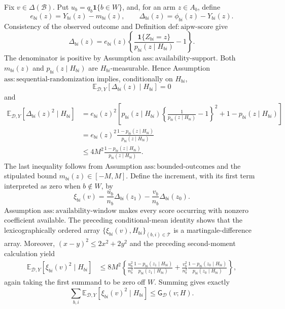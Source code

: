Fix \(v\in\Delta(\mathcal B)\).  Put \(u_b=q_b\mathbf 1\{b\in W\}\), and, for an arm \(z\in A_b\), define
\[
e_{bi}(z)=Y_{bi}(z)-m_{bi}(z),
\qquad
\Delta_{bi}(z)=\phi_{bi}(z)-Y_{bi}(z).
\]
Consistency of the observed outcome and Definition \(\mathrm{def:aipw\text{-}score}\) give
\[
\Delta_{bi}(z)
=e_{bi}(z)\left\{\frac{\mathbf 1\{Z_{bi}=z\}}
 {p_{bi}(z\mid H_{bi})}-1\right\}.
\]
The denominator is positive by Assumption \(\mathrm{ass:availability\text{-}support}\).  Both \(m_{bi}(z)\) and \(p_{bi}(z\mid H_{bi})\) are \(H_{bi}\)-measurable.  Hence Assumption \(\mathrm{ass:sequential\text{-}randomization}\) implies, conditionally on \(H_{bi}\),
\[
\mathbb E_{\mathcal D,Y}[\Delta_{bi}(z)\mid H_{bi}]=0
\]
and
\[
\begin{aligned}
\mathbb E_{\mathcal D,Y}[\Delta_{bi}(z)^2\mid H_{bi}]
&=e_{bi}(z)^2\left[
p_{bi}(z\mid H_{bi})
 \left\{\frac1{p_{bi}(z\mid H_{bi})}-1\right\}^{2}
+1-p_{bi}(z\mid H_{bi})\right]\\
&=e_{bi}(z)^2
 \frac{1-p_{bi}(z\mid H_{bi})}{p_{bi}(z\mid H_{bi})}\\
&\le 4M^2
 \frac{1-p_{bi}(z\mid H_{bi})}{p_{bi}(z\mid H_{bi})}.
\end{aligned}
\]
The last inequality follows from Assumption \(\mathrm{ass:bounded\text{-}outcomes}\) and the stipulated bound \(m_{bi}(z)\in[-M,M]\).  Define the increment, with its first term interpreted as zero when \(b\notin W\), by
\[
\xi_{bi}(v)
=\frac{u_b}{n_b}\Delta_{bi}(z_1)
-\frac{v_b}{n_b}\Delta_{bi}(z_0).
\]
Assumption \(\mathrm{ass:availability\text{-}window}\) makes every score occurring with nonzero coefficient available.  The preceding conditional-mean identity shows that the lexicographically ordered array 
\(\{\xi_{bi}(v),H_{bi}\}_{(b,i)\in\mathcal T}\) is a martingale-difference array.  Moreover, \((x-y)^2\le 2x^2+2y^2\) and the preceding second-moment calculation yield
\[
\begin{aligned}
\mathbb E_{\mathcal D,Y}[\xi_{bi}(v)^2\mid H_{bi}]
&\le 8M^2\left\{
\frac{u_b^2}{n_b^2}
\frac{1-p_{bi}(z_1\mid H_{bi})}{p_{bi}(z_1\mid H_{bi})}
+\frac{v_b^2}{n_b^2}
\frac{1-p_{bi}(z_0\mid H_{bi})}{p_{bi}(z_0\mid H_{bi})}
\right\},
\end{aligned}
\]
again taking the first summand to be zero off \(W\).  Summing gives exactly
\[
\sum_{b,i}\mathbb E_{\mathcal D,Y}[\xi_{bi}(v)^2\mid H_{bi}]
\le \mathsf G_{\mathcal D}(v;H).
\]

